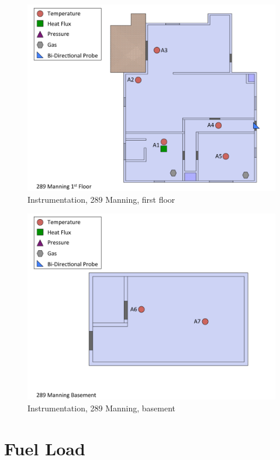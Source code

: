 \documentclass[12pt,oneside]{book}
\begin{document}
\begin{figure}[!ht]
\includegraphics[width=6.5in]{../Drawings/Instrumentation/289_Manning_1st_Floor}
\caption{Instrumentation, 289 Manning, first floor}
\label{fig:Instrumentation_289_Manning_1st_Floor}
\end{figure}

\begin{figure}[!ht]
\includegraphics[width=6.5in]{../Drawings/Instrumentation/289_Manning_Basement}
\caption{Instrumentation, 289 Manning, basement}
\label{fig:Instrumentation_289_Manning_basement}
\end{figure}


\clearpage


\section{Fuel Load}
\label{sec:Fuel_Load}
\end{document}
